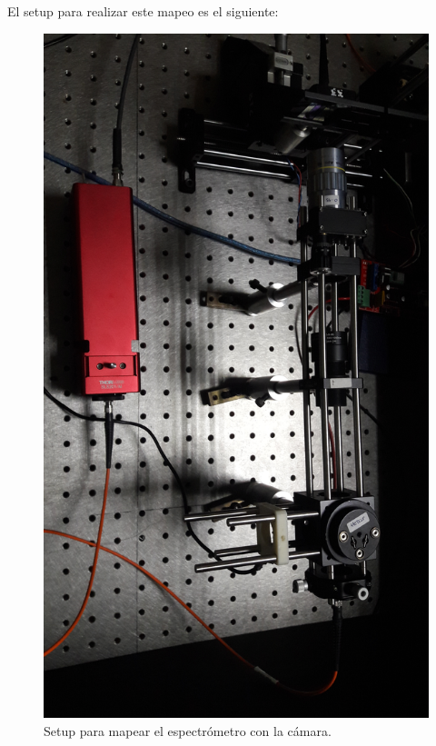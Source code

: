 El setup para realizar este mapeo es el siguiente:
\begin{figure}[H]
	\centering
	\includegraphics[scale=0.1]{Figs/microespectrometro/mapespeccam.jpg}
	\caption{Setup para mapear el espectrómetro con la cámara.}
	\label{fig:bgcel}
\end{figure}


